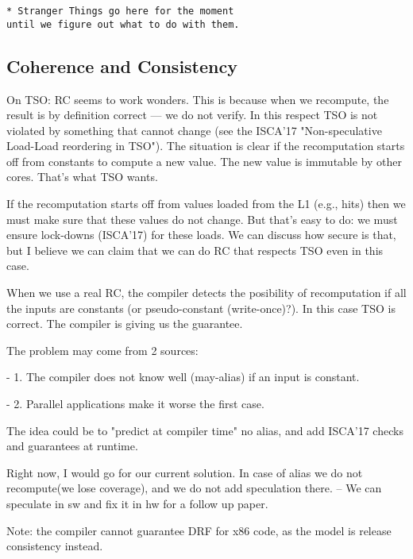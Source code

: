 \begin{verbatim}
* Stranger Things go here for the moment 
until we figure out what to do with them.
 \end{verbatim}


\subsection{Coherence and Consistency}
On TSO:
RC seems to work wonders. This is because when we recompute,
the result is by definition correct --- we do not verify.
In this respect TSO is not violated by something that cannot change (see
the ISCA'17 "Non-speculative Load-Load reordering in TSO").
The situation is clear if the recomputation starts off from constants to
compute a new value. The new value is immutable by other cores.
That's what TSO wants.

If the recomputation starts off from values loaded from the L1 (e.g.,
hits) then we must make sure that these values do not change.
But that's easy to do: we must ensure lock-downs (ISCA'17) for these
loads. We can discuss how secure is that, but I believe we can claim
that we can do RC that respects TSO even in this case. 

When we use a real RC, the compiler detects the posibility of recomputation if all the inputs are constants (or pseudo-constant (write-once)?). In this case TSO is correct. The compiler is giving us the guarantee.

The problem may come from 2 sources:

- 1. The compiler does not know well (may-alias) if an input is constant.

- 2. Parallel applications make it worse the first case.

The idea could be to "predict at compiler time" no alias, and add ISCA'17 checks and guarantees at runtime.

Right now, I would go for our current solution. In case of alias we do not recompute(we lose coverage), and we do not add speculation there. -- We can speculate in sw and fix it in hw for a follow up paper.

Note: the compiler cannot guarantee DRF for x86 code, as the model is release consistency instead. 


